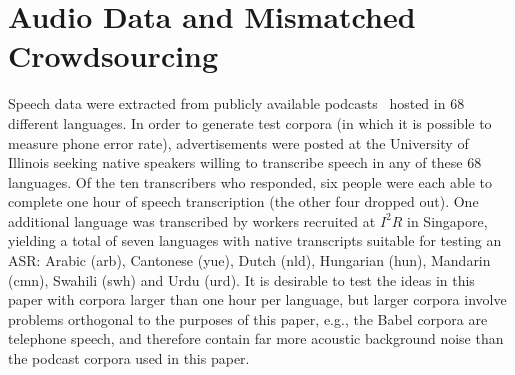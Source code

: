 \section{Audio Data and Mismatched Crowdsourcing}
\label{sec:data}

Speech data were extracted from publicly available podcasts~\cite{SBS}
hosted in 68 different languages.  In order to generate test corpora
(in which it is possible to measure phone error rate), advertisements
were posted at the University of Illinois seeking native speakers
willing to transcribe speech in any of these 68 languages.  Of the ten
transcribers who responded, six people were each able to complete one
hour of speech transcription (the other four dropped out).  One
additional language was transcribed by workers recruited at $I^2R$ in
Singapore, yielding a total of seven languages with native
transcripts suitable for testing an ASR: Arabic (arb), Cantonese
(yue), Dutch (nld), Hungarian (hun), Mandarin (cmn), Swahili (swh) and
Urdu (urd).
{\color{blue} It is desirable to test the ideas in this paper with corpora larger
than one hour per language, but larger corpora involve problems
orthogonal to the purposes of this paper, e.g., the Babel corpora
are telephone speech, and therefore contain far more acoustic
background noise than the podcast corpora used in this paper.}

